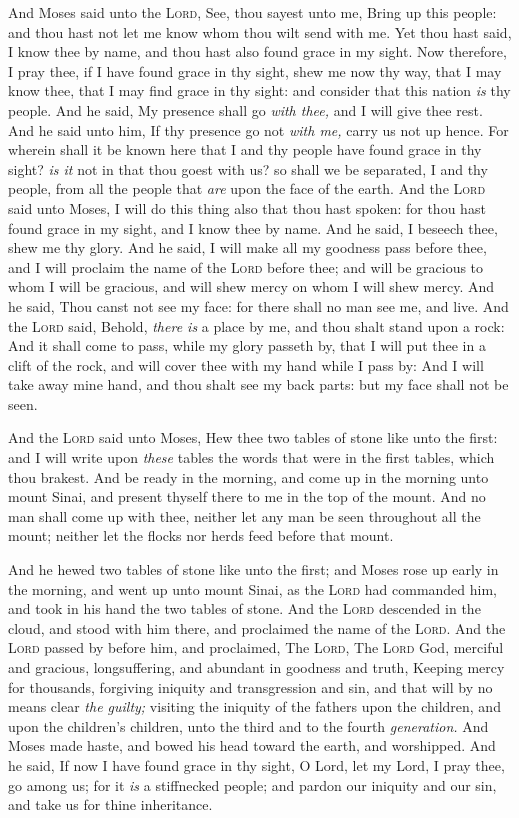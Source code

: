 \documentclass[11pt,letterpaper,oneside]{memoir}
\begin{document}
And Moses said unto the \textsc{Lord}, See, thou sayest unto me, Bring
up this people: and thou hast not let me know whom thou wilt send with
me. Yet thou hast said, I know thee by name, and thou hast also found
grace in my sight. Now therefore, I pray thee, if I have found grace in
thy sight, shew me now thy way, that I may know thee, that I may find
grace in thy sight: and consider that this nation \emph{is} thy people.
And he said, My presence shall go \emph{with thee,} and I will give thee
rest. And he said unto him, If thy presence go not \emph{with me,} carry
us not up hence. For wherein shall it be known here that I and thy
people have found grace in thy sight? \emph{is it} not in that thou
goest with us? so shall we be separated, I and thy people, from all the
people that \emph{are} upon the face of the earth. And the \textsc{Lord}
said unto Moses, I will do this thing also that thou hast spoken: for
thou hast found grace in my sight, and I know thee by name. And he said,
I beseech thee, shew me thy glory. And he said, I will make all my
goodness pass before thee, and I will proclaim the name of the
\textsc{Lord} before thee; and will be gracious to whom I will be
gracious, and will shew mercy on whom I will shew mercy. And he said,
Thou canst not see my face: for there shall no man see me, and live. And
the \textsc{Lord} said, Behold, \emph{there is} a place by me, and thou
shalt stand upon a rock: And it shall come to pass, while my glory
passeth by, that I will put thee in a clift of the rock, and will cover
thee with my hand while I pass by: And I will take away mine hand, and
thou shalt see my back parts: but my face shall not be seen.

And the \textsc{Lord} said unto Moses, Hew thee two tables of stone like
unto the first: and I will write upon \emph{these} tables the words that
were in the first tables, which thou brakest. And be ready in the
morning, and come up in the morning unto mount Sinai, and present
thyself there to me in the top of the mount. And no man shall come up
with thee, neither let any man be seen throughout all the mount; neither
let the flocks nor herds feed before that mount.

And he hewed two tables of stone like unto the first; and Moses rose up
early in the morning, and went up unto mount Sinai, as the \textsc{Lord}
had commanded him, and took in his hand the two tables of stone. And the
\textsc{Lord} descended in the cloud, and stood with him there, and
proclaimed the name of the \textsc{Lord}. And the \textsc{Lord} passed
by before him, and proclaimed, The \textsc{Lord}, The \textsc{Lord} God,
merciful and gracious, longsuffering, and abundant in goodness and
truth, Keeping mercy for thousands, forgiving iniquity and transgression
and sin, and that will by no means clear \emph{the guilty;} visiting the
iniquity of the fathers upon the children, and upon the children's
children, unto the third and to the fourth \emph{generation. }And Moses
made haste, and bowed his head toward the earth, and worshipped. And he
said, If now I have found grace in thy sight, O Lord, let my Lord, I
pray thee, go among us; for it \emph{is} a stiffnecked people; and
pardon our iniquity and our sin, and take us for thine inheritance.
\end{document}
